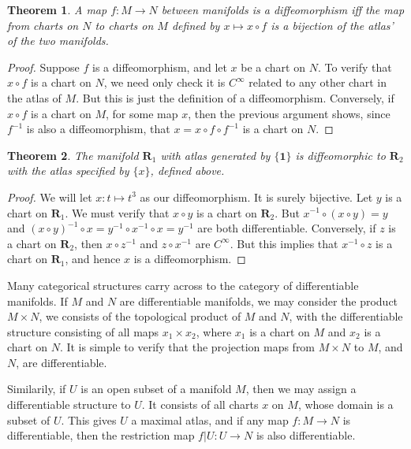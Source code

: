 \documentclass[12pt]{report}
\theoremstyle{plain}
\newtheorem{theorem}{Theorem}[chapter]
\theoremstyle{definition}
\begin{document}
\begin{theorem}
    A map $f:M \to N$ between manifolds is a diffeomorphism iff the map from charts on $N$ to charts on $M$ defined by $x \mapsto x \circ f$ is a bijection of the atlas' of the two manifolds.
\end{theorem}
\begin{proof}
    Suppose $f$ is a diffeomorphism, and let $x$ be a chart on $N$. To verify that $x \circ f$ is a chart on $N$, we need only check it is $C^\infty$ related to any other chart in the atlas of $M$. But this is just the definition of a diffeomorphism. Conversely, if $x \circ f$ is a chart on $M$, for some map $x$, then the previous argument shows, since $f^{-1}$ is also a diffeomorphism, that $x = x \circ f \circ f^{-1}$ is a chart on $N$.
\end{proof}

\begin{theorem}
    The manifold $\mathbf{R}_1$ with atlas generated by $\{ \mathbf{1} \}$ is diffeomorphic to $\mathbf{R}_2$ with the atlas specified by $\{ x \}$, defined above.
\end{theorem}
\begin{proof}
    We will let $x: t \mapsto t^3$ as our diffeomorphism. It is surely bijective. Let $y$ is a chart on $\mathbf{R}_1$. We must verify that $x \circ y$ is a chart on $\mathbf{R}_2$. But $x^{-1} \circ (x \circ y) = y$ and $(x \circ y)^{-1} \circ x = y^{-1} \circ x^{-1} \circ x = y^{-1}$ are both differentiable. Conversely, if $z$ is a chart on $\mathbf{R}_2$, then $x \circ z^{-1}$ and $z \circ x^{-1}$ are $C^\infty$. But this implies that $x^{-1} \circ z$ is a chart on $\mathbf{R}_1$, and hence $x$ is a diffeomorphism.
\end{proof}

Many categorical structures carry across to the category of differentiable manifolds. If $M$ and $N$ are differentiable manifolds, we may consider the product $M \times N$, we consists of the topological product of $M$ and $N$, with the differentiable structure consisting of all maps $x_1 \times x_2$, where $x_1$ is a chart on $M$ and $x_2$ is a chart on $N$. It is simple to verify that the projection maps from $M \times N$ to $M$, and $N$, are differentiable.

Similarily, if $U$ is an open subset of a manifold $M$, then we may assign a differentiable structure to $U$. It consists of all charts $x$ on $M$, whose domain is a subset of $U$. This gives $U$ a maximal atlas, and if any map $f:M \to N$ is differentiable, then the restriction map $f|U:U \to N$ is also differentiable.
\end{document}
